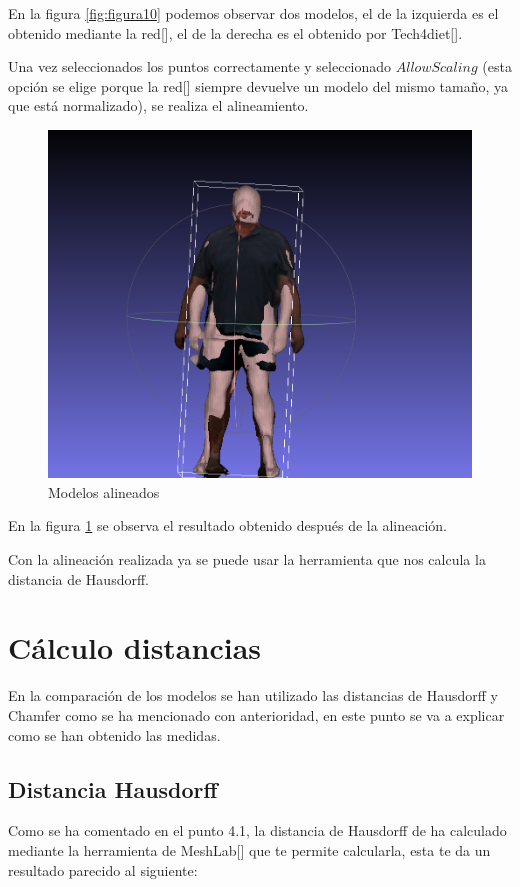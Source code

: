 En la figura \ref{fig:figura10} podemos observar dos modelos, el de la izquierda es el obtenido mediante la red[\cite{pifu}], el de la derecha es el obtenido por Tech4diet[\cite{tech}].

Una vez seleccionados los puntos correctamente y seleccionado $Allow Scaling$ (esta opción se elige porque la red[\cite{pifu}] siempre devuelve un modelo del mismo tamaño, ya que está normalizado), se realiza el alineamiento.

\begin{figure}[H]
	\centering
	\includegraphics[scale=0.27]{imagenes/alineamiento2.png}
	\caption{Modelos alineados}
	\label{fig:figura11}
\end{figure}

En la figura \ref{fig:figura11} se observa el resultado obtenido después de la alineación.

Con la alineación realizada ya se puede usar la herramienta que nos calcula la distancia de Hausdorff.

\section{Cálculo distancias}

En la comparación de los modelos se han utilizado las distancias de Hausdorff y Chamfer como se ha mencionado con anterioridad, en este punto se va a explicar como se han obtenido las medidas.

\subsection{Distancia Hausdorff}
Como se ha comentado en el punto 4.1, la distancia de Hausdorff de ha calculado mediante la herramienta de MeshLab[\cite{MeshLab}] que te permite calcularla, esta te da un resultado parecido al siguiente: 

